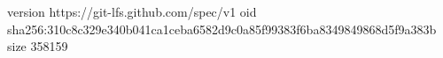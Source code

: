 version https://git-lfs.github.com/spec/v1
oid sha256:310c8c329e340b041ca1ceba6582d9c0a85f99383f6ba8349849868d5f9a383b
size 358159
